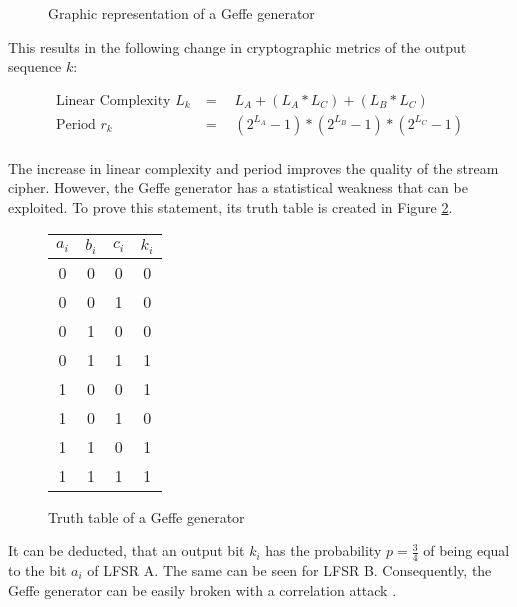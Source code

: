 \begin{figure}[h]
	\centering
	
	\caption{Graphic representation of a Geffe generator}
	\label{fig:output-selection}
\end{figure}

\newpage

This results in the following change in cryptographic metrics of the output sequence $k$: \cite[p. 234]{Smart.2016}

\[\begin{array}{ll}
	\text{Linear Complexity }L_k &= \quad L_A + (L_A*L_C) + (L_B*L_C) \\
	\text{Period }r_k &= \quad (2^{L_A} - 1)*(2^{L_B} - 1)*(2^{L_C} - 1) \\
\end{array}\]


The increase in linear complexity and period improves the quality of the stream cipher. However, the Geffe generator has a statistical weakness that can be exploited. To prove this statement, its truth table is created in Figure \ref{fig:geffe-truth-table}. \\

\begin{figure}[ht]
	\centering
	\begin{tabular}{|c|c|c||c|}
		\hline
		$a_i$ & $b_i$ & $c_i$ & $k_i$ \\
		\hline
		0 & 0 & 0 & 0 \\
		\hline
		0 & 0 & 1 & 0 \\
		\hline
		0 & 1 & 0 & 0 \\
		\hline
		0 & 1 & 1 & 1 \\
		\hline
		1 & 0 & 0 & 1 \\
		\hline
		1 & 0 & 1 & 0 \\
		\hline
		1 & 1 & 0 & 1 \\
		\hline
		1 & 1 & 1 & 1 \\
		\hline
	\end{tabular}
	\caption{Truth table of a Geffe generator}
	\label{fig:geffe-truth-table}
\end{figure}


It can be deducted, that an output bit $k_i$ has the probability $p=\frac{3}{4}$ of being equal to the bit $a_i$ of LFSR A. The same can be seen for LFSR B. Consequently, the Geffe generator can be easily broken with a correlation attack \cite[p. 104]{Pommerening.2000}. \\ 

